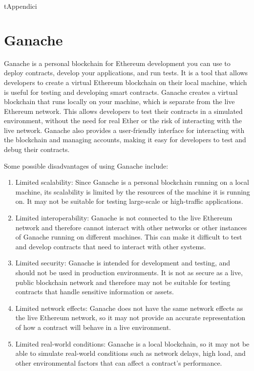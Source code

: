 \documentclass[target=mst,aauheader=]{thud}
\begin{document}
%
t{Appendici}

\chapter{Ganache}
\label{appendixGanache}
Ganache is a personal blockchain for Ethereum development you can use to deploy contracts, develop your applications, and run tests. It is a tool that allows developers to create a virtual Ethereum blockchain on their local machine, which is useful for testing and developing smart contracts. Ganache creates a virtual blockchain that runs locally on your machine, which is separate from the live Ethereum network. This allows developers to test their contracts in a simulated environment, without the need for real Ether or the risk of interacting with the live network. Ganache also provides a user-friendly interface for interacting with the blockchain and managing accounts, making it easy for developers to test and debug their contracts.


Some possible disadvantages of using Ganache include:

\begin{enumerate}

    \item Limited scalability: Since Ganache is a personal blockchain running on a local machine, its scalability is limited by the resources of the machine it is running on. It may not be suitable for testing large-scale or high-traffic applications.
    \item Limited interoperability: Ganache is not connected to the live Ethereum network and therefore cannot interact with other networks or other instances of Ganache running on different machines. This can make it difficult to test and develop contracts that need to interact with other systems.
    \item Limited security: Ganache is intended for development and testing, and should not be used in production environments. It is not as secure as a live, public blockchain network and therefore may not be suitable for testing contracts that handle sensitive information or assets.
    \item Limited network effects: Ganache does not have the same network effects as the live Ethereum network, so it may not provide an accurate representation of how a contract will behave in a live environment.
    \item Limited real-world conditions: Ganache is a local blockchain, so it may not be able to simulate real-world conditions such as network delays, high load, and other environmental factors that can affect a contract's performance.

\end{enumerate}
\end{document}
